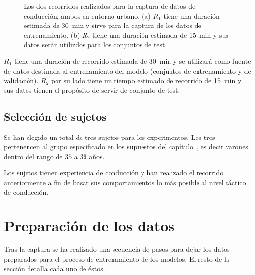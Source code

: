 \begin{figure}
	\centering
	\qquad	{}
	\caption[Dos recorridos para la captura de datos de conducción]{Los dos recorridos realizados para la captura de datos de conducción, ambos en entorno urbano. (a) $R_1$ tiene una duración estimada de \SI{30}{\minute} y sirve para la captura de los datos de entrenamiento. (b) $R_2$ tiene una duración estimada de \SI{15}{\minute} y sus datos serán utilizdos para los conjuntos de test.}
	\label{fig:the-two-routes}
\end{figure}

$R_1$ tiene una duración de recorrido estimada de \SI{30}{\minute} y se utilizará como fuente de datos destinada al entrenamiento del modelo (conjuntos de entrenamiento y de validación). $R_2$ por su lado tiene un tiempo estimado de recorrido de  \SI{15}{\minute} y sus datos tienen el propósito de servir de conjunto de test.

\subsection{Selección de sujetos}

Se han elegido un total de tres sujetos para los experimentos. Los tres pertenencen al grupo especificado en los supuestos del capítulo~, es decir varones dentro del rango de $35$ a $39$ años.

Los sujetos tienen experiencia de conducción y han realizado el recorrido anteriormente a fin de basar sus comportamientos lo más posible al nivel táctico de conducción.


\section{Preparación de los datos}

Tras la captura se ha realizado una secuencia de pasos para dejar los datos preparados para el proceso de entrenamiento de los modelos. El resto de la sección detalla cada uno de éstos.

